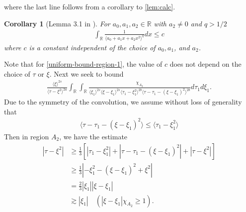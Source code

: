 \documentclass[12pt,reqno]{amsart}
\numberwithin{equation}{section}  %
\numberwithin{figure}{section}
\newcommand{\rr}{\mathbb{R}}
\theoremstyle{plain}
\newtheorem{corollary}{Corollary}
\theoremstyle{definition}
\theoremstyle{remark}
\begin{document}
%
%
where the last line follows from a corollary to \autoref{lem:calc}.
%
%
%
%
%
%
%
%
\begin{corollary}[Lemma 3.1 in \cite{Farah:2009uq}]
  For $a_{0}, a_{1}, a_{2} \in \rr$ with $a_{2} \neq 0$ and $q > 1/2$
  \begin{equation*}
  \begin{split}
    \int_{\rr} \frac{1}{\langle a_{0} + a_{1}x + a_{2}x^{2} \rangle ^{q}} dx \le c
  \end{split}
  \end{equation*}
  where $c$ is a constant independent of the choice of $a_{0}, a_{1}$, and $a_{2}$.
\label{cor:integral-bound}
\end{corollary}
Note that for \eqref{uniform-bound-region-1}, the
value of $c$ does not depend on the choice of $\tau$ or $\xi$. 
Next we seek to bound
\begin{equation}
  \label{case-1-region-2}
  \begin{split}
    \frac{ \langle \xi
    \rangle ^{2s}}{\langle \tau - \xi^{2} \rangle ^{2a}}
    \int_{\rr} \int_{\rr} \frac{\chi_{A_{2}}}{ \langle \xi_{1} \rangle ^{2s} \langle \xi-\xi_{1} \rangle ^{2s} 
    \langle \tau_{1} - \xi_{1}^{2} \rangle^{2b} \langle  \tau - \tau_{1} -
    (\xi - \xi_{1})^{2} \rangle^{2b} }
    d \tau_1 d \xi_{1}.
  \end{split}
\end{equation}
Due to the symmetry of the convolution, we assume without loss of generality that
%
%
\begin{equation*}
\begin{split}
  \langle \tau - \tau_{1} - (\xi - \xi_{1})^{2} \rangle \le \langle
  \tau_{1} - \xi_{1}^{2}\rangle 
\end{split}
\end{equation*}
%
%
Then in region $A_{2}$, we have the estimate
%
%
\begin{equation}
\begin{split}
  | \tau - \xi^{2} |
  & \ge \frac{1}{3}\left[ | \tau_{1} - \xi_{1}^{2} | + | \tau -
  \tau_{1} - (\xi - \xi_{1})^{2}
  | + | \tau - \xi^{2} | \right]
  \\
  & \ge \frac{1}{3} | - \xi_{1}^{2} - (\xi - \xi_{1})^{2} + \xi^{2} |
  \\
  & = \frac{2}{3} | \xi_{1} | | \xi - \xi_{1} |
  \\
  & \gtrsim | \xi_{1} | \quad (| \xi - \xi_{1} |\chi_{A_{2}} \ge 1).
\end{split}
\label{region-2-smoothing}
\end{equation}
\end{document}
